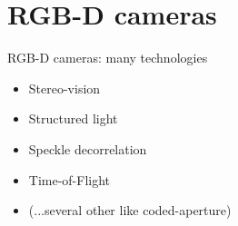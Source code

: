 \documentclass[compress]{beamer}
\begin{document}
\section{RGB-D cameras}

\begin{frame}{RGB-D cameras: many technologies}
    \begin{itemize}
        \item Stereo-vision
        \item Structured light
        \item Speckle decorrelation
        \item Time-of-Flight
        \item (...several other like coded-aperture)
    \end{itemize}
\end{frame}

\end{document}
